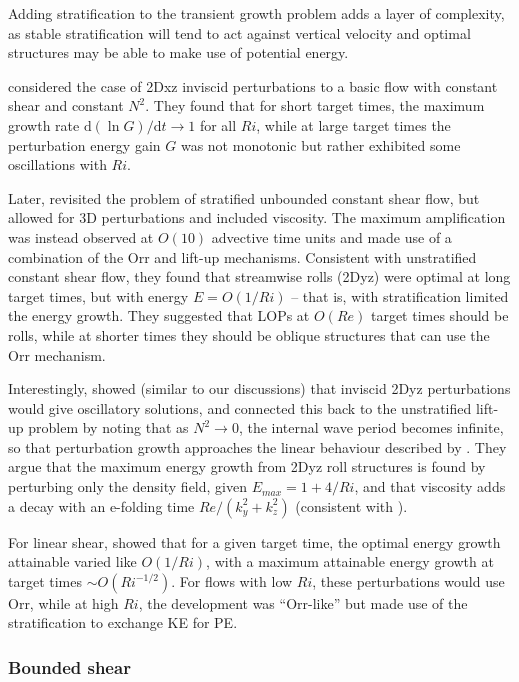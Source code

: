 \documentclass{article}
\begin{document}
Adding stratification to the transient growth problem adds a layer of complexity, as stable stratification will tend to act against vertical velocity and optimal structures may be able to make use of potential energy. 

\citet{Farrell1993b} considered the case of 2Dxz inviscid perturbations to a basic flow with constant shear and constant $N^2$. They found that for short target times, the maximum growth rate $\mathrm{d}(\ln G)/\mathrm{d}t\rightarrow1$ for all $Ri$, while at large target times the perturbation energy gain $G$ was not monotonic but rather exhibited some oscillations with $Ri$. 

Later, \citet{Bakas2001} revisited the problem of stratified unbounded constant shear flow, but allowed for 3D perturbations and included viscosity. The maximum amplification was instead observed at $O(10)$ advective time units and made use of a combination of the Orr and lift-up mechanisms. Consistent with unstratified constant shear flow, they found that streamwise rolls (2Dyz) were optimal at long target times, but with energy $E=O(1/Ri)$ -- that is, with stratification limited the energy growth. They suggested that LOPs at $O(Re)$ target times should be rolls, while at shorter times they should be oblique structures that can use the Orr mechanism. 

Interestingly, \citet{Bakas2001} showed (similar to our discussions) that inviscid 2Dyz perturbations would give oscillatory solutions, and connected this back to the unstratified lift-up problem by noting that as $N^2\rightarrow0$, the internal wave period becomes infinite, so that perturbation growth approaches the linear behaviour described by \citet{Ellingsen1975}. They argue that the maximum energy growth from 2Dyz roll structures is found by perturbing only the density field, given $E_{max}=1+4/Ri$, and that viscosity adds a decay with an e-folding time $Re/(k_y^2+k_z^2)$ (consistent with \citet{Arratia2013b}). 

For linear shear, \citet{Tearle2004} showed that for a given target time, the optimal energy growth attainable varied like $O(1/Ri)$, with a maximum attainable energy growth at target times $\sim O(Ri^{-1/2})$. For flows with low $Ri$, these perturbations would use Orr, while at high $Ri$, the development was ``Orr-like'' but made use of the stratification to exchange KE for PE. 

\subsubsection{Bounded shear}
\end{document}
